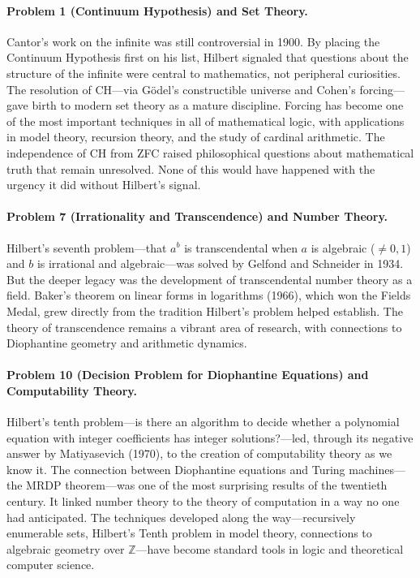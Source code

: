 \paragraph{Problem 1 (Continuum Hypothesis) and Set Theory.} Cantor's work on the infinite was still controversial in 1900. By placing the Continuum Hypothesis first on his list, Hilbert signaled that questions about the structure of the infinite were central to mathematics, not peripheral curiosities. The resolution of CH---via G\"odel's constructible universe and Cohen's forcing---gave birth to modern set theory as a mature discipline. Forcing has become one of the most important techniques in all of mathematical logic, with applications in model theory, recursion theory, and the study of cardinal arithmetic. The independence of CH from ZFC raised philosophical questions about mathematical truth that remain unresolved. None of this would have happened with the urgency it did without Hilbert's signal.

\paragraph{Problem 7 (Irrationality and Transcendence) and Number Theory.} Hilbert's seventh problem---that $a^b$ is transcendental when $a$ is algebraic ($\neq 0,1$) and $b$ is irrational and algebraic---was solved by Gelfond and Schneider in 1934. But the deeper legacy was the development of transcendental number theory as a field. Baker's theorem on linear forms in logarithms (1966), which won the Fields Medal, grew directly from the tradition Hilbert's problem helped establish. The theory of transcendence remains a vibrant area of research, with connections to Diophantine geometry and arithmetic dynamics.

\paragraph{Problem 10 (Decision Problem for Diophantine Equations) and Computability Theory.} Hilbert's tenth problem---is there an algorithm to decide whether a polynomial equation with integer coefficients has integer solutions?---led, through its negative answer by Matiyasevich (1970), to the creation of computability theory as we know it. The connection between Diophantine equations and Turing machines---the MRDP theorem---was one of the most surprising results of the twentieth century. It linked number theory to the theory of computation in a way no one had anticipated. The techniques developed along the way---recursively enumerable sets, Hilbert's Tenth problem in model theory, connections to algebraic geometry over $\mathbb{Z}$---have become standard tools in logic and theoretical computer science.


